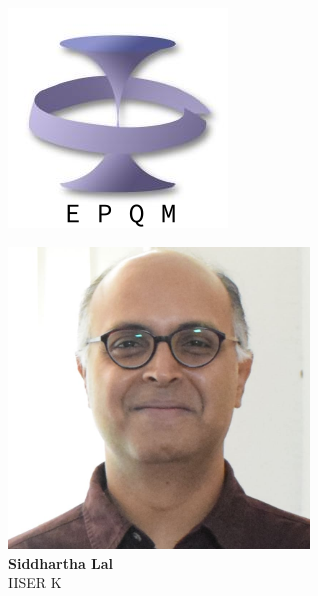 \documentclass[10pt,aspectratio=169]{beamer}
\begin{document}
\begin{frame}{}
\hspace*{\fill}
\begin{minipage}{0.1\textwidth}
	\includegraphics[width=\textwidth]{epqm_logo_mod.jpeg}
\end{minipage}
\begin{minipage}{0.25\textwidth}
	\centering
	\includegraphics[width=0.6\textwidth]{slal.jpg}\\
	\footnotesize{{\bf Siddhartha Lal}\\
	IISER K}
\end{minipage}
\begin{minipage}{0.25\textwidth}

\end{minipage}
\end{frame}
\end{document}
